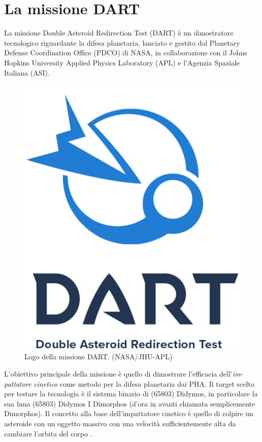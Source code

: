 \documentclass[a4paper,11pt,openright]{book}
\begin{document}
\chapter{La missione DART}\label{ch:ch_3}

La missione Double Asteroid Redirection Test (DART) è un dimostratore tecnologico riguardante la difesa planetaria, lanciato e gestito dal Planetary Defense Coordination Office (PDCO) di NASA, in collaborazione con il Johns Hopkins University Applied Physics Laboratory (APL) e l'Agenzia Spaziale Italiana (ASI).

\begin{figure}[!h]
    \centering
    \includegraphics[scale=0.5]{figure/DART_mission_patch.png}
    \caption[Logo della missione DART.]{Logo della missione DART. (NASA/JHU-APL)}
    \label{fig:logo_DART}
\end{figure}

L'obiettivo principale della missione è quello di dimostrare l'efficacia dell'\textit{im}-\\
\textit{pattatore} \textit{cinetico} come metodo per la difesa planetaria dai PHA. Il target scelto per testare la tecnologia è il sistema binario di (65803) Didymos, in particolare la sua luna (65803) Didymos I Dimorphos (d'ora in avanti chiamata semplicemente Dimorphos). Il concetto alla base dell'impattatore cinetico è quello di colpire un asteroide con un oggetto massivo con una velocità sufficientemente alta da cambiare l'orbita del corpo \citep{rivkin_double_2021}.
\end{document}
